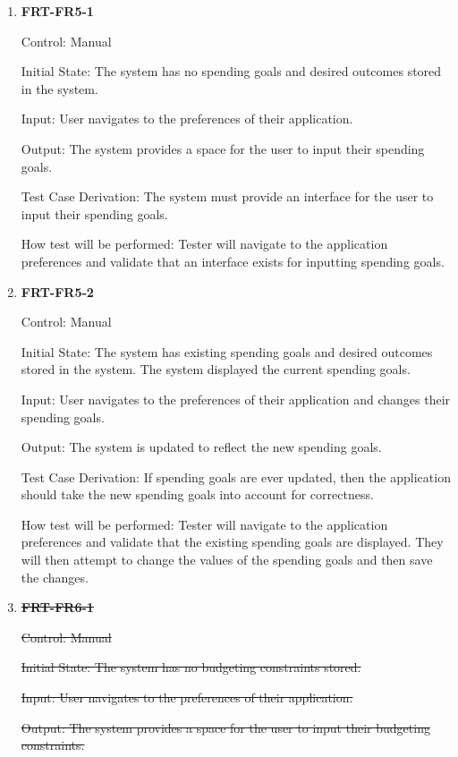 \documentclass[12pt, titlepage]{article}
\begin{document}
\begin{enumerate}

\item{\textbf{FRT-FR5-1}}

Control: Manual
          
Initial State: The system has no spending goals and desired outcomes stored in the system.

Input: User navigates to the preferences of their application.
          
Output: The system provides a space for the user to input their spending goals.

Test Case Derivation: The system must provide an interface for the user to input their spending goals.
          
How test will be performed: Tester will navigate to the application preferences and validate that an interface exists for inputting spending goals.

\item{\textbf{FRT-FR5-2}}

Control: Manual
          
Initial State: The system has existing spending goals and desired outcomes stored in the system. The system displayed the current spending goals.

Input: User navigates to the preferences of their application and changes their spending goals.
          
Output: The system is updated to reflect the new spending goals.

Test Case Derivation: If spending goals are ever updated, then the application should take the new spending goals into account
for correctness.
          
How test will be performed: Tester will navigate to the application preferences and validate that the existing spending goals are displayed. They will then attempt to change the values of the spending goals and then save the changes.

\item{\sout{\textbf{FRT-FR6-1}}}

\sout{Control: Manual}
          
\sout{Initial State: The system has no budgeting constraints stored.}

\sout{Input: User navigates to the preferences of their application.}
          
\sout{Output: The system provides a space for the user to input their budgeting constraints.}


\end{enumerate}
\end{document}

